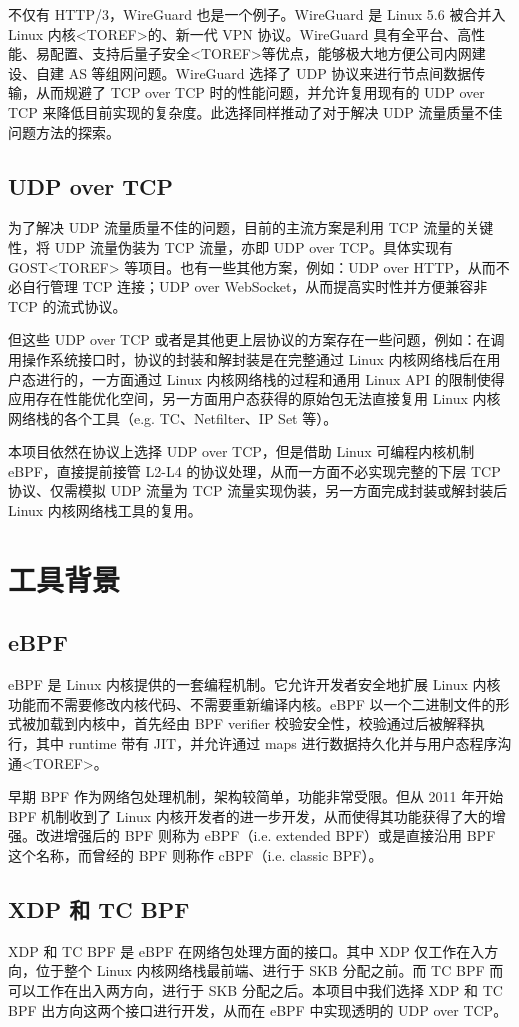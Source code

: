 不仅有 HTTP/3，WireGuard 也是一个例子。WireGuard 是 Linux 5.6 被合并入 Linux 内核<TOREF>的、新一代 VPN 协议。WireGuard 具有全平台、高性能、易配置、支持后量子安全<TOREF>等优点，能够极大地方便公司内网建设、自建 AS 等组网问题。WireGuard 选择了 UDP 协议来进行节点间数据传输，从而规避了 TCP over TCP 时的性能问题，并允许复用现有的 UDP over TCP 来降低目前实现的复杂度。此选择同样推动了对于解决 UDP 流量质量不佳问题方法的探索。

\subsection{UDP over TCP}

为了解决 UDP 流量质量不佳的问题，目前的主流方案是利用 TCP 流量的关键性，将 UDP 流量伪装为 TCP 流量，亦即 UDP over TCP。具体实现有 GOST<TOREF> 等项目。也有一些其他方案，例如：UDP over HTTP，从而不必自行管理 TCP 连接；UDP over WebSocket，从而提高实时性并方便兼容非 TCP 的流式协议。

但这些 UDP over TCP 或者是其他更上层协议的方案存在一些问题，例如：在调用操作系统接口时，协议的封装和解封装是在完整通过 Linux 内核网络栈后在用户态进行的，一方面通过 Linux 内核网络栈的过程和通用 Linux API 的限制使得应用存在性能优化空间，另一方面用户态获得的原始包无法直接复用 Linux 内核网络栈的各个工具（e.g. TC、Netfilter、IP Set 等）。

本项目依然在协议上选择 UDP over TCP，但是借助 Linux 可编程内核机制 eBPF，直接提前接管 L2-L4 的协议处理，从而一方面不必实现完整的下层 TCP 协议、仅需模拟 UDP 流量为 TCP 流量实现伪装，另一方面完成封装或解封装后 Linux 内核网络栈工具的复用。

\section{工具背景}

\subsection{eBPF}

eBPF 是 Linux 内核提供的一套编程机制。它允许开发者安全地扩展 Linux 内核功能而不需要修改内核代码、不需要重新编译内核。eBPF 以一个二进制文件的形式被加载到内核中，首先经由 BPF verifier 校验安全性，校验通过后被解释执行，其中 runtime 带有 JIT，并允许通过 maps 进行数据持久化并与用户态程序沟通<TOREF>。

早期 BPF 作为网络包处理机制，架构较简单，功能非常受限。但从 2011 年开始 BPF 机制收到了 Linux 内核开发者的进一步开发，从而使得其功能获得了大的增强。改进增强后的 BPF 则称为 eBPF（i.e. extended BPF）或是直接沿用 BPF 这个名称，而曾经的 BPF 则称作 cBPF（i.e. classic BPF）。\cite{10.1145/3371038}

\subsection{XDP 和 TC BPF}

XDP 和 TC BPF 是 eBPF 在网络包处理方面的接口。其中 XDP 仅工作在入方向，位于整个 Linux 内核网络栈最前端、进行于 SKB 分配之前。而 TC BPF 而可以工作在出入两方向，进行于 SKB 分配之后。本项目中我们选择 XDP 和 TC BPF 出方向这两个接口进行开发，从而在 eBPF 中实现透明的 UDP over TCP。
